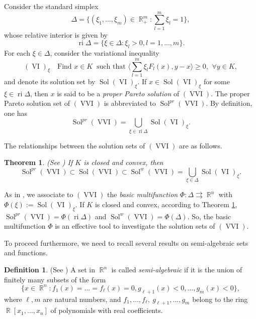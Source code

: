 \documentclass[]{interact}
\theoremstyle{plain}%
\newtheorem{theorem}{Theorem}[section]
\theoremstyle{definition}
\newtheorem{definition}{Definition}[section]
\DeclareMathOperator{\Sol}{Sol}
\DeclareMathOperator{\VI}{VI}
\DeclareMathOperator{\ri}{ri}
\DeclareMathOperator{\R}{\mathbb{R}}
\DeclareMathOperator{\VVI}{VVI}
\begin{document}
Consider the standard simplex $$\Delta=\Big\{(\xi_1,\dots,\xi_m)\in \R^m_+:
\sum_{l=1}^m\xi_l=1\Big\},$$ whose relative interior is given by 
$$\ri\Delta=\{\xi\in\Delta: \xi_l>0, l=1,...,m\}.$$
For each $\xi\in\Delta$, consider the variational inequality 
$$(\VI)_{\xi} \quad  \text{Find }  x\in K \ \text{ such that }  \Big\langle  \sum_{l=1}^m\xi_lF_l(x),y-x\Big\rangle  \geq 0, \ \, \forall y\in
K,$$
and denote its solution set by $\Sol(\VI)_{\xi}$. If  $x\in {\Sol(\VI)}_\xi$ for some $\xi\in\ri\Delta$, then $x$ is said to be a {\it proper Pareto solution} of $(\VVI)$. The proper Pareto solution set of $(\VVI)$ is abbreviated to $\Sol^{pr}(\VVI)$.  By definition, one has 
\begin{equation}\label{pr}
\Sol^{pr}(\VVI)=\bigcup_{\xi\in{\ri}\Delta}{\Sol(\VI)}_\xi.
\end{equation}

The relationships between the solution sets of $(\VVI)$ are as follows.

\begin{theorem}\label{scalarization} {\rm (See \cite{LKLY98})} If $K$ is closed and convex, then
\begin{equation}\label{scalar}
\Sol^{pr}(\VVI)\subset {\Sol(\VVI)}\subset {\Sol^w}{(\VVI)}=\bigcup_{\xi\in\Delta}{\Sol(\VI)}_\xi.
\end{equation}
\end{theorem}

As in \cite{HoaPhuongYen2005}, we associate to $(\VVI)$ the \textit{basic multifunction} $\Phi:\Delta \rightrightarrows \R^n$ with
$\Phi(\xi):= \Sol(\VI)_{\xi}$. If $K$ is closed and convex, according to Theorem \ref{scalarization}, $\Sol^{pr}(\VVI)=\Phi(\ri\Delta)$ and $\Sol^{w}(\VVI)=\Phi(\Delta)$. So, the basic multifunction $\Phi$ is an effective tool to investigate the solution sets of $(\VVI)$.

To proceed furthermore,  we need to recall several results on semi-algebraic sets and functions. 
\begin{definition} {\rm (See \cite{Coste02})} {\rm A set in $\R^n$ is called  \textit{semi-algebraic} if it is the union of finitely
		many subsets of the form
		\begin{equation*}\label{basicsemi}
		\big\{x\in \R^n:f_1(x)=...=f_\ell(x)=0,g_{\ell+1}(x)<0,\dots,g_m(x)<0\big\},
		\end{equation*}
		where $\ell,m$ are natural numbers, and $f_1,\dots, f_\ell,\ g_{\ell+1},\dots,g_m$ belong to the ring $\R[x_1,\dots, x_n]$ of polynomials with real coefficients.} 
\end{definition}
\end{document}
